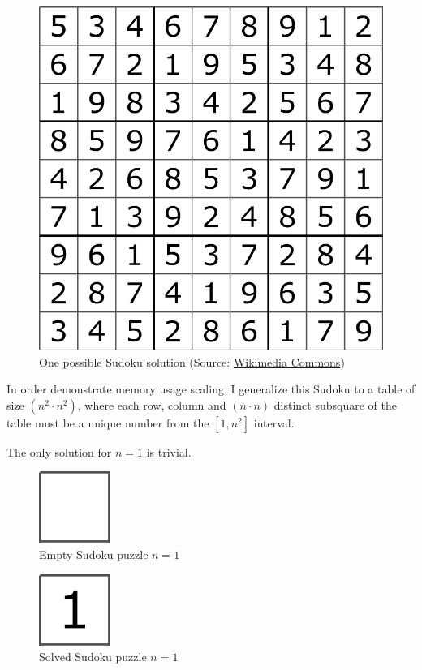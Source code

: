 \begin{figure}[H]
    \centering
    \includegraphics[width=0.7\linewidth]{content/assets/03_grovers_algorithm/sudoku_3_solved.png}
    \caption{One possible Sudoku solution (Source:  \href{https://en.wikipedia.org/wiki/File:Sudoku_Puzzle_by_L2G-20050714_solution_standardized_layout.svg}{Wikimedia Commons})}
    \label{fig:my_label}
\end{figure}

In order demonstrate memory usage scaling, I generalize this Sudoku to a table of size $(n^2\cdot{} n^2)$, where each row, column and $(n\cdot{}n)$ distinct subsquare of the table must be a unique number from the $[1, n^2]$ interval.

The only solution for $n=1$ is trivial.

\begin{figure}[H]
    \centering
    \includegraphics[width=0.077\linewidth]{content/assets/03_grovers_algorithm/sudoku_1.png}
    \caption{Empty Sudoku puzzle $n=1$}
    \label{fig:my_label}
\end{figure}

\begin{figure}[H]
    \centering
    \includegraphics[width=0.077\linewidth]{content/assets/03_grovers_algorithm/sudoku_1_solved.png}
    \caption{Solved Sudoku puzzle $n=1$}
    \label{fig:my_label}
\end{figure}

